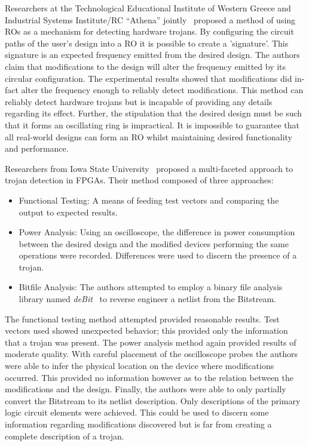 \documentclass[conference]{IEEEtran}
\begin{document}
Researchers at the Technological Educational Institute of Western Greece and Industrial Systems Institute/RC “Athena” jointly~\cite{ringOscillatorMethod} proposed a method of using \acrfull{ROs} as a mechanism for detecting hardware trojans.
By configuring the circuit paths of the user's design into a \acrshort{RO} it is possible to create a 'signature'.
This signature is an expected frequency emitted from the desired design. 
The authors claim that modifications to the design will alter the frequency emitted by its circular configuration.
The experimental results showed that modifications did in-fact alter the frequency enough to reliably detect modifications.
This method can reliably detect hardware trojans but is incapable of providing any details regarding its effect.
Further, the stipulation that the desired design must be such that it forms an oscillating ring is impractical.
It is impossible to guarantee that all real-world designs can form an \acrshort{RO} whilst maintaining desired functionality and performance.

Researchers from Iowa State University~\cite{multiFacetedApproach} proposed a multi-faceted approach to trojan detection in \acrshort{FPGA}s.
Their method composed of three approaches:
\begin{itemize}
	\item Functional Testing: A means of feeding test vectors and comparing the output to expected results.
	\item Power Analysis: Using an oscilloscope, the difference in power consumption between the desired design and the modified devices performing the same operations were recorded. Differences were used to discern the presence of a trojan.
	\item Bitfile Analysis: The authors attempted to employ a binary file analysis library named \textit{deBit}~\cite{bitStreamToNetlist} to reverse engineer a netlist from the \gls{Bitstream}.
\end{itemize}
The functional testing method attempted provided reasonable results. 
Test vectors used showed unexpected behavior; this provided only the information that a trojan was present.
The power analysis method again provided results of moderate quality.
With careful placement of the oscilloscope probes the authors were able to infer the physical location on the device where modifications occurred.
This provided no information however as to the relation between the modifications and the design.
Finally, the authors were able to only partially convert the \gls{Bitstream} to its netlist description.
Only descriptions of the primary logic circuit elements were achieved.
This could be used to discern some information regarding modifications discovered but is far from creating a complete description of a trojan.
\end{document}
